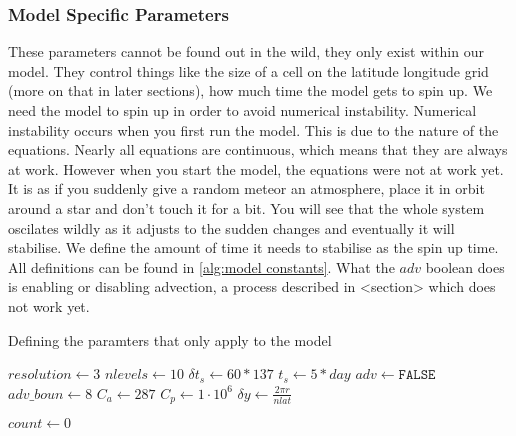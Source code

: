 \subsubsection{Model Specific Parameters}
These parameters cannot be found out in the wild, they only exist within our model. They control things like the size of a cell on the latitude longitude grid (more on that in later sections),
how much time the model gets to spin up. We need the model to spin up in order to avoid numerical instability. Numerical instability occurs when you first run the model. This is due to the nature of the equations. Nearly all equations are continuous, which means that they are always at work. However 
when you start the model, the equations were not at work yet. It is as if you suddenly give a random meteor an atmosphere, place it in orbit around a star and don't touch it for a bit. You will 
see that the whole system oscilates wildly as it adjusts to the sudden changes and eventually it will stabilise. We define the amount of time it needs to stabilise as the spin up time. All 
definitions can be found in \autoref{alg:model constants}. What the $adv$ boolean does is enabling or disabling advection, a process described in <section> which does not work yet.

\begin{algorithm}
    \caption{Defining the paramters that only apply to the model}
    \label{alg:model constants}
    $resolution \leftarrow 3$ 
    $nlevels \leftarrow 10$ 
    $\delta t_s \leftarrow 60*137$ 
    $t_s \leftarrow 5*day$ 
    $adv \leftarrow \texttt{FALSE}$ 
    $adv\_boun \leftarrow 8$ 
    $C_a \leftarrow 287$ 
    $C_p \leftarrow 1 \cdot 10^6$ 
    $\delta y \leftarrow \frac{2\pi r}{nlat}$ 

    $count \leftarrow 0$ \;


\end{algorithm}